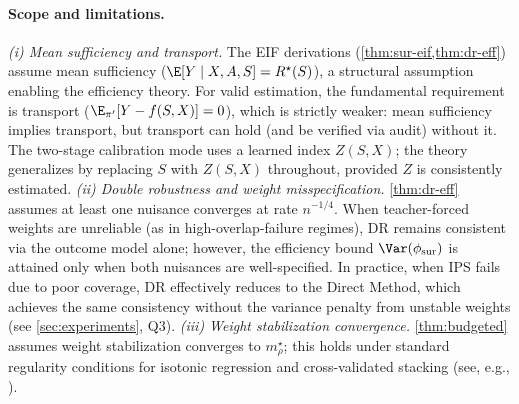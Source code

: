 \paragraph{Scope and limitations.}
\emph{(i) Mean sufficiency and transport.} The EIF derivations (\cref{thm:sur-eif,thm:dr-eff}) assume mean sufficiency ($\E[Y\mid X,A,S]=R^\star(S)$), a structural assumption enabling the efficiency theory. For valid estimation, the fundamental requirement is transport ($\E_{\pi'}[Y-f(S,X)]=0$), which is strictly weaker: mean sufficiency implies transport, but transport can hold (and be verified via audit) without it. The two-stage calibration mode uses a learned index $Z(S,X)$; the theory generalizes by replacing $S$ with $Z(S,X)$ throughout, provided $Z$ is consistently estimated.
\emph{(ii) Double robustness and weight misspecification.} \cref{thm:dr-eff} assumes at least one nuisance
converges at rate $n^{-1/4}$. When teacher-forced weights are unreliable (as in high-overlap-failure regimes),
DR remains consistent via the outcome model alone; however, the efficiency bound $\Var(\phi_{\mathrm{sur}})$ is
attained only when both nuisances are well-specified. In practice, when IPS fails due to poor coverage, DR
effectively reduces to the Direct Method, which achieves the same consistency without the variance penalty
from unstable weights (see \cref{sec:experiments}, Q3).
\emph{(iii) Weight stabilization convergence.} \cref{thm:budgeted} assumes weight stabilization converges to $m^\star_\rho$; this holds
under standard regularity conditions for isotonic regression and cross-validated stacking (see, e.g.,
\citet{vanderLaan2007SuperLearner}).
